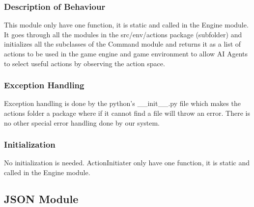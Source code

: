 \documentclass[12pt, titlepage]{article}
\begin{document}
\subsubsection{Description of Behaviour}
This module only have one function, it is static and called in the Engine module. It goes through all the modules in the src/env/actions package (subfolder) and initializes all the subclasses of the Command module and returns it as a list of actions to be used in the game engine and game environment to allow AI Agents to select useful actions by observing the action space.

\subsubsection{Exception Handling}
Exception handling is done by the python's \_\_init\_\_.py file which makes the actions folder a package where if it cannot find a file will throw an error. There is no other special error handling done by our system.

\subsubsection{Initialization}
No initialization is needed. ActionInitiater only have one function, it is static and called in the Engine module.

\newpage
\subsection{JSON Module}
\end{document}
